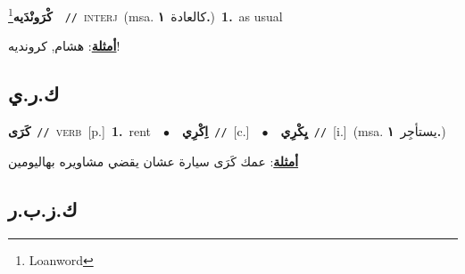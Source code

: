 \documentclass[10pt,a4paper,twoside]{article} %
\begin{document}
\begin{multicols}{2}
{\setlength\topsep{0pt}\textbf{\foreignlanguage{arabic}{كْرَونْدَيه}}\footnote{Loanword}\ \ {\color{gray}\texttt{//}\color{black}}\ \textsc{interj}\ \color{gray}(msa. \foreignlanguage{arabic}{كالعادة}~\foreignlanguage{arabic}{\textbf{١.}})\color{black}\ \textbf{1.}~as usual\  \begin{flushright}\color{gray}\foreignlanguage{arabic}{\textbf{\underline{\foreignlanguage{arabic}{أمثلة}}}: هشام, كرونديه!}\end{flushright}\color{black}} \vspace{2mm}

\vspace{-3mm}
\subsection*{\color{blue}\foreignlanguage{arabic}{ك.ر.ي}\color{blue}{}} 

{\setlength\topsep{0pt}\textbf{\foreignlanguage{arabic}{كَرَى}}\ {\color{gray}\texttt{//}\color{black}}\ \textsc{verb}\ [p.]\ \textbf{1.}~rent\ \ $\bullet$\ \ \setlength\topsep{0pt}\textbf{\foreignlanguage{arabic}{اِكْرِي}}\ {\color{gray}\texttt{//}\color{black}}\ [c.]\ \ $\bullet$\ \ \setlength\topsep{0pt}\textbf{\foreignlanguage{arabic}{يِكْرِي}}\ {\color{gray}\texttt{//}\color{black}}\ [i.]\ \color{gray}(msa. \foreignlanguage{arabic}{يستأجِر}~\foreignlanguage{arabic}{\textbf{١.}})\color{black}\  \begin{flushright}\color{gray}\foreignlanguage{arabic}{\textbf{\underline{\foreignlanguage{arabic}{أمثلة}}}: عمك كَرَى سيارة عشان يقضي مشاويره بهاليومين}\end{flushright}\color{black}} \vspace{2mm}

\vspace{-3mm}
\subsection*{\color{blue}\foreignlanguage{arabic}{ك.ز.ب.ر}\color{blue}{}} 


\end{multicols}
\end{document}
